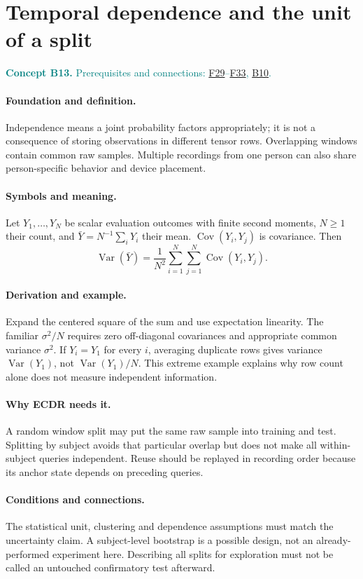 \documentclass[11pt,a4paper]{article}
\newcommand{\conceptid}{Front matter}
\newcommand{\concept}[3]{\clearpage\renewcommand{\conceptid}{#1}%
\section{#2}\label{concept:#1}%
\textcolor{teal}{\textbf{Concept #1.} Prerequisites and connections: #3.}\par
\typeout{ECDR-CONCEPT-START #1 PAGE=\thepage}}
\begin{document}
\concept{B13}{Temporal dependence and the unit of a split}{\hyperref[concept:F29]{F29}--\hyperref[concept:F33]{F33}, \hyperref[concept:B10]{B10}}
\paragraph{Foundation and definition.}
Independence means a joint probability factors appropriately; it is not a
consequence of storing observations in different tensor rows. Overlapping
windows contain common raw samples. Multiple recordings from one person
can also share person-specific behavior and device placement.
\paragraph{Symbols and meaning.}
Let $Y_1,\ldots,Y_N$ be scalar evaluation outcomes with finite second
moments, $N\ge1$ their count, and $\bar Y=N^{-1}\sum_iY_i$ their mean.
$\operatorname{Cov}(Y_i,Y_j)$ is covariance. Then
\[
 \operatorname{Var}(\bar Y)=\frac1{N^2}
 \sum_{i=1}^{N}\sum_{j=1}^{N}\operatorname{Cov}(Y_i,Y_j).
\]
\paragraph{Derivation and example.}
Expand the centered square of the sum and use expectation linearity.
The familiar $\sigma^2/N$ requires zero off-diagonal covariances and
appropriate common variance $\sigma^2$. If $Y_i=Y_1$ for every $i$,
averaging duplicate rows gives variance $\operatorname{Var}(Y_1)$, not
$\operatorname{Var}(Y_1)/N$. This extreme example explains why row count
alone does not measure independent information.
\paragraph{Why ECDR needs it.}
A random window split may put the same raw sample into training and test.
Splitting by subject avoids that particular overlap but does not make all
within-subject queries independent. Reuse should be replayed in recording
order because its anchor state depends on preceding queries.
\paragraph{Conditions and connections.}
The statistical unit, clustering and dependence assumptions must match the
uncertainty claim. A subject-level bootstrap is a possible design, not an
already-performed experiment here. Describing all splits for exploration
must not be called an untouched confirmatory test afterward.
\par\label{endconcept:B13}
\end{document}
